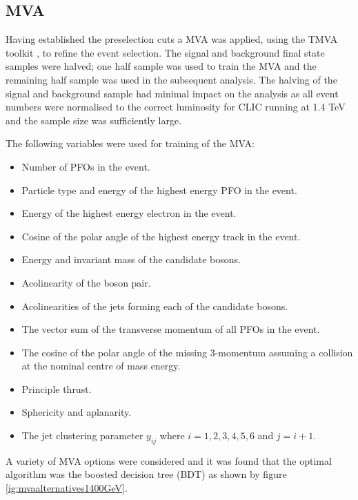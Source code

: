 
\subsection{MVA}
\label{sec:mva1400GeV}
Having established the preselection cuts a MVA was applied, using the TMVA toolkit \cite{Hocker:2007ht}, to refine the event selection.  The signal and background final state samples were halved; one half sample was used to train the MVA and the remaining half sample was used in the subsequent analysis.  The halving of the signal and background sample had minimal impact on the analysis as all event numbers were normalised to the correct luminosity for CLIC running at 1.4 TeV and the sample size was sufficiently large.

The following variables were used for training of the MVA:

\begin{itemize}
\item Number of PFOs in the event.
\item Particle type and energy of the highest energy PFO in the event.
\item Energy of the highest energy electron in the event.
\item Cosine of the polar angle of the highest energy track in the event.
\item Energy and invariant mass of the candidate bosons.
\item Acolinearity of the boson pair.
\item Acolinearities of the jets forming each of the candidate bosons.
\item The vector sum of the transverse momentum of all PFOs in the event. 
\item The cosine of the polar angle of the missing 3-momentum assuming a collision at the nominal centre of mass energy.
\item Principle thrust.
\item Sphericity and aplanarity.
\item The jet clustering parameter $y_{ij}$ where $i = 1,2,3,4,5,6$ and $j=i+1$.
\end{itemize}

A variety of MVA options were considered and it was found that the optimal algorithm was the boosted decision tree (BDT) as shown by figure \ref{ig:mvaalternatives1400GeV}.  

